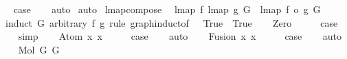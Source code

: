 \begin{isabellebody}
\ \isamarkupfalse%
\ {\isacharquery}{\kern0pt}case\isanewline
\ \ \isamarkupfalse%
\ auto\isanewline
{}\isamarkupfalse%
\ auto%
\endisatagproof
{\isafoldproof}%
%
\isadelimproof
\isanewline
%
\endisadelimproof
\isanewline
\isanewline
{}\isamarkupfalse%
\ lmap{\isacharunderscore}{\kern0pt}compose{\isacharcolon}{\kern0pt}\isanewline
\ \ {\isachardoublequoteopen}lmap\ f\ {\isacharparenleft}{\kern0pt}lmap\ g\ G{\isacharparenright}{\kern0pt}\ {\isacharequal}{\kern0pt}\ lmap\ {\isacharparenleft}{\kern0pt}f\ o\ g{\isacharparenright}{\kern0pt}\ G{\isachardoublequoteclose}\isanewline
%
\isadelimproof
%
\endisadelimproof
%
\isatagproof
{}\isamarkupfalse%
\ {\isacharparenleft}{\kern0pt}induct\ G\ arbitrary{\isacharcolon}{\kern0pt}\ f\ g\ rule{\isacharcolon}{\kern0pt}\ graph{\isachardot}{\kern0pt}induct{\isacharbrackleft}{\kern0pt}of\ {\isacharunderscore}{\kern0pt}\ {\isachardoublequoteopen}{\isacharpercent}{\kern0pt}{\isacharunderscore}{\kern0pt}{\isachardot}{\kern0pt}\ True{\isachardoublequoteclose}\ {\isachardoublequoteopen}{\isacharpercent}{\kern0pt}{\isacharunderscore}{\kern0pt}{\isachardot}{\kern0pt}\ True{\isachardoublequoteclose}{\isacharbrackright}{\kern0pt}{\isacharparenright}{\kern0pt}\isanewline
\ \ \isamarkupfalse%
\ Zero\isanewline
\ \ \isamarkupfalse%
\ \isamarkupfalse%
\ {\isacharquery}{\kern0pt}case\isanewline
\ \ \isamarkupfalse%
\ simp\isanewline
{}\isamarkupfalse%
\isanewline
\ \ \isamarkupfalse%
\ {\isacharparenleft}{\kern0pt}Atom\ x{}\ x{}{\isacharparenright}{\kern0pt}\isanewline
\ \ \isamarkupfalse%
\ \isamarkupfalse%
\ {\isacharquery}{\kern0pt}case\isanewline
\ \ \isamarkupfalse%
\ auto\isanewline
{}\isamarkupfalse%
\isanewline
\ \ \isamarkupfalse%
\ {\isacharparenleft}{\kern0pt}Fusion\ x{}\ x{}{\isacharparenright}{\kern0pt}\isanewline
\ \ \isamarkupfalse%
\ \isamarkupfalse%
\ {\isacharquery}{\kern0pt}case\isanewline
\ \ \isamarkupfalse%
\ auto\isanewline
{}\isamarkupfalse%
\isanewline
\ \ \isamarkupfalse%
\ {\isacharparenleft}{\kern0pt}Mol\ G{}\ G{}{\isacharparenright}{\kern0pt}\isanewline
\ \ \isamarkupfalse%
\ \isamarkupfalse%

\end{isabellebody}

